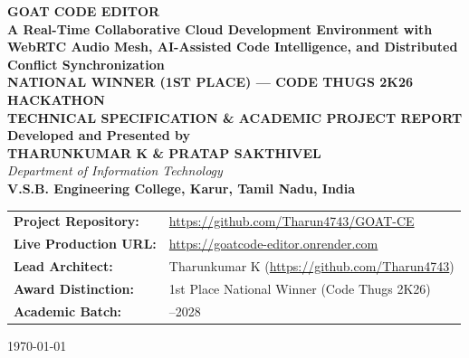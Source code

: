 \documentclass[12pt,a4paper]{report}
\begin{document}
\begin{titlepage}
    \centering
    \vspace*{0.8cm}
    
    {\Huge \textbf{GOAT CODE EDITOR}}\\[0.3cm]
    {\LARGE \textbf{A Real-Time Collaborative Cloud Development Environment with WebRTC Audio Mesh, AI-Assisted Code Intelligence, and Distributed Conflict Synchronization}}\\[1.2cm]
    
    {\large \textbf{NATIONAL WINNER (1ST PLACE) --- CODE THUGS 2K26 HACKATHON}}\\[0.3cm]
    {\large \textbf{TECHNICAL SPECIFICATION \& ACADEMIC PROJECT REPORT}}\\[1.0cm]
    
    \textbf{Developed and Presented by}\\[0.3cm]
    {\Large \textbf{THARUNKUMAR K \& PRATAP SAKTHIVEL}}\\[0.2cm]
    \textit{Department of Information Technology}\\[0.1cm]
    \textbf{V.S.B. Engineering College, Karur, Tamil Nadu, India}\\[1.5cm]
    
    \vfill
    
    \begin{tabular}{>{\raggedright\arraybackslash\bfseries}p{4.2cm}>{\raggedright\arraybackslash}p{10.2cm}}
        Project Repository: & \url{https://github.com/Tharun4743/GOAT-CE} \\
        Live Production URL: & \url{https://goatcode-editor.onrender.com} \\
        Lead Architect: & Tharunkumar K (\url{https://github.com/Tharun4743}) \\
        Award Distinction: & 1st Place National Winner (Code Thugs 2K26) \\
        Academic Batch: & 2024--2028 \\
    \end{tabular}
    
    \vspace*{0.8cm}
    {\small \today}
\end{titlepage}

\cleardoublepage
{}
\setcounter{page}{1}
\end{document}
